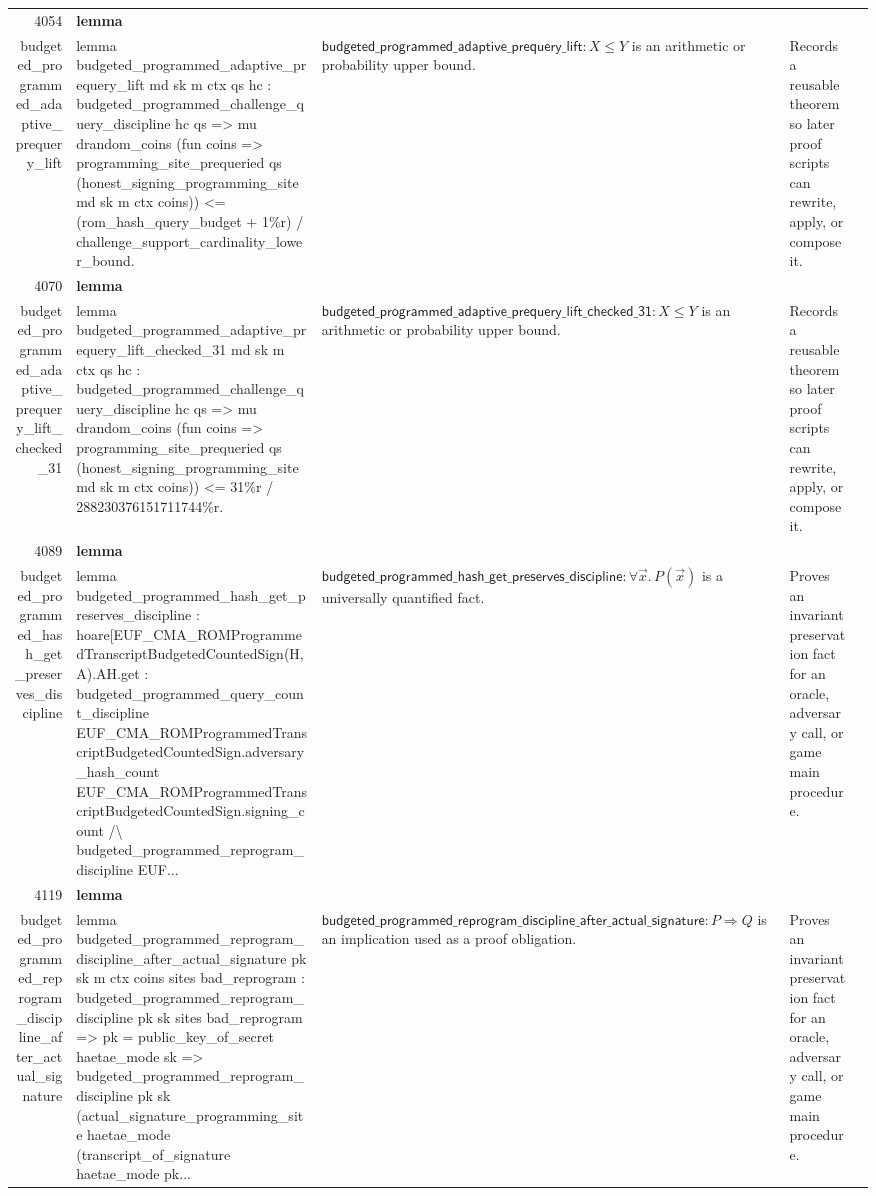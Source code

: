 \documentclass[10pt]{article}
\newcommand{\ec}[1]{\begingroup\ttfamily\scriptsize #1\endgroup}
\begin{document}
\begin{longtable}{r L{0.17\textwidth} L{0.26\textwidth} L{0.27\textwidth} L{0.20\textwidth}}
4054 & \textbf{lemma}\\\ec{budgeted\_programmed\_adaptive\_prequery\_lift} & \ec{lemma budgeted\_programmed\_adaptive\_prequery\_lift md sk m ctx qs hc : budgeted\_programmed\_challenge\_query\_discipline hc qs => mu drandom\_coins (fun coins => programming\_site\_prequeried qs (honest\_signing\_programming\_site md sk m ctx coins)) <= (rom\_hash\_query\_budget + 1\%r) / challenge\_support\_cardinality\_lower\_bound.} & \(\mathsf{budgeted\_programmed\_adaptive\_prequery\_lift} : X \le Y\) is an arithmetic or probability upper bound. & Records a reusable theorem so later proof scripts can rewrite, apply, or compose it. \\
4070 & \textbf{lemma}\\\ec{budgeted\_programmed\_adaptive\_prequery\_lift\_checked\_31} & \ec{lemma budgeted\_programmed\_adaptive\_prequery\_lift\_checked\_31 md sk m ctx qs hc : budgeted\_programmed\_challenge\_query\_discipline hc qs => mu drandom\_coins (fun coins => programming\_site\_prequeried qs (honest\_signing\_programming\_site md sk m ctx coins)) <= 31\%r / 288230376151711744\%r.} & \(\mathsf{budgeted\_programmed\_adaptive\_prequery\_lift\_checked\_31} : X \le Y\) is an arithmetic or probability upper bound. & Records a reusable theorem so later proof scripts can rewrite, apply, or compose it. \\
4089 & \textbf{lemma}\\\ec{budgeted\_programmed\_hash\_get\_preserves\_discipline} & \ec{lemma budgeted\_programmed\_hash\_get\_preserves\_discipline : hoare[EUF\_CMA\_ROMProgrammedTranscriptBudgetedCountedSign(H, A).AH.get : budgeted\_programmed\_query\_count\_discipline EUF\_CMA\_ROMProgrammedTranscriptBudgetedCountedSign.adversary\_hash\_count EUF\_CMA\_ROMProgrammedTranscriptBudgetedCountedSign.signing\_count /\textbackslash{} budgeted\_programmed\_reprogram\_discipline EUF...} & \(\mathsf{budgeted\_programmed\_hash\_get\_preserves\_discipline} : \forall \vec{x}.\, P(\vec{x})\) is a universally quantified fact. & Proves an invariant preservation fact for an oracle, adversary call, or game main procedure. \\
4119 & \textbf{lemma}\\\ec{budgeted\_programmed\_reprogram\_discipline\_after\_actual\_signature} & \ec{lemma budgeted\_programmed\_reprogram\_discipline\_after\_actual\_signature pk sk m ctx coins sites bad\_reprogram : budgeted\_programmed\_reprogram\_discipline pk sk sites bad\_reprogram => pk = public\_key\_of\_secret haetae\_mode sk => budgeted\_programmed\_reprogram\_discipline pk sk (actual\_signature\_programming\_site haetae\_mode (transcript\_of\_signature haetae\_mode pk...} & \(\mathsf{budgeted\_programmed\_reprogram\_discipline\_after\_actual\_signature} : P \Rightarrow Q\) is an implication used as a proof obligation. & Proves an invariant preservation fact for an oracle, adversary call, or game main procedure. \\

\end{longtable}
\end{document}
